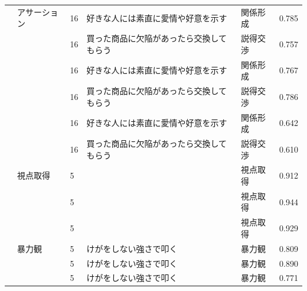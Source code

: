 \begin{landscape}
\begin{longtable}{p{2cm}p{2cm}p{2cm}p{6cm}p{2cm}p{2cm}}
		\textcite{Akazawa202192}    & アサーション                           & 16  & 好きな人には素直に愛情や好意を示す                                   & 関係形成                 & 0.785      \\
		                         &                                  & 16  & 買った商品に欠陥があったら交換してもらう                                & 説得交渉                 & 0.757      \\
		                         &                                  & 16  & 好きな人には素直に愛情や好意を示す                                   & 関係形成                 & 0.767      \\
		                         &                                  & 16  & 買った商品に欠陥があったら交換してもらう                                & 説得交渉                 & 0.786      \\
		                         &                                  & 16  & 好きな人には素直に愛情や好意を示す                                   & 関係形成                 & 0.642      \\
		                         &                                  & 16  & 買った商品に欠陥があったら交換してもらう                                & 説得交渉                 & 0.610      \\
		                         & 視点取得                             & 5   &                                                     & 視点取得                 & 0.912      \\
		                         &                                  & 5   &                                                     & 視点取得                 & 0.944      \\
		                         &                                  & 5   &                                                     & 視点取得                 & 0.929      \\
		                         & 暴力観                              & 5   & けがをしない強さで叩く                                         & 暴力観                  & 0.809      \\
		                         &                                  & 5   & けがをしない強さで叩く                                         & 暴力観                  & 0.890      \\
		                         &                                  & 5   & けがをしない強さで叩く                                         & 暴力観                  & 0.771      \\

\end{longtable}
\end{landscape}
